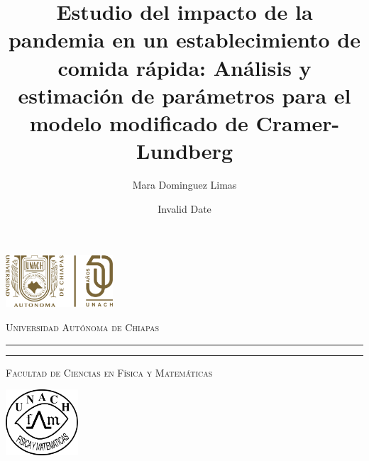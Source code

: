 \documentclass[
  us-letterpaper,
]{scrreprt}
\title{Estudio del impacto de la pandemia en un establecimiento de
comida rápida: Análisis y estimación de parámetros para el modelo
modificado de Cramer-Lundberg}
\author{Mara Dominguez Limas}
\date{Invalid Date}
\theoremstyle{definition}
\theoremstyle{plain}
\theoremstyle{plain}
\theoremstyle{remark}
\begin{document}
\begin{titlepage}
\hspace{-1.7cm} %
\begin{minipage}[t][0.03\textheight][c]{0.22\textwidth}
        \includegraphics[width=4.0cm]{FCFM-UNACH.png}
\end{minipage}\hspace{0.9cm}
\begin{minipage}[t][0.03\textheight][c]{0.69\textwidth}
\begin{center}
                \textsc{\huge Universidad Autónoma de Chiapas}\\[0.3cm]
                \hrule height 2.5pt
                \vspace{0.2cm}
                \hrule height1pt
                \vspace{0.3cm}
                \textsc{\Large Facultad de Ciencias en Física y Matemáticas}
\end{center}
\end{minipage}\hspace{0.2cm}
\begin{minipage}[t][0.03\textheight][c]{0.2\textwidth}
		\includegraphics[width=2.7cm]{logofcfm.png}
\end{minipage}\\
\begin{minipage}[t][0.93\textheight][c]{0.06\textwidth}
\vspace{60pt}
    \begin{center}
        \vrule width1pt height18cm
        \vspace{5mm}
        \vrule width2.5pt height18cm
        \vspace{5mm}
        \vrule width1pt height18cm
   \end{center}
\end{minipage}\hspace{1.3cm} 
\begin{minipage}[t][0.95\textheight][c]{0.76\textwidth}


\end{minipage}
\end{titlepage}
\end{document}
